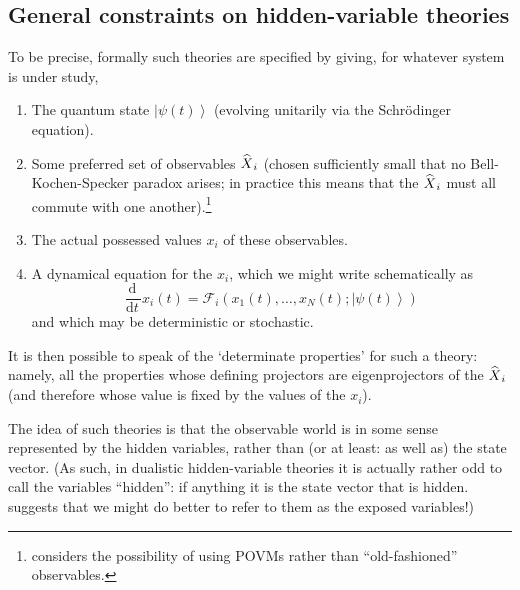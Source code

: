 \documentclass[12pt]{article}
\newcommand{\be}{\begin{equation}}
\newcommand{\ee}{\end{equation}}
\newcommand{\dr}[1]{\ensuremath{\mathrm{d} #1\,}}
\newcommand{\mc}[1]{\ensuremath{\mathcal{#1}}}
\newcommand{\ddt}{\ensuremath{\frac{\dr{}}{\dr{t}}}}
\newcommand{\ket}[1]{\ensuremath{\left|  #1 \right\rangle}}
\newcommand{\op}[1]{\ensuremath{\widehat{\textsf{\ensuremath{#1}}}}}
\begin{document}
\subsection{General constraints on hidden-variable theories}\label{DMWWhvconstraints}

To be precise, formally such theories are specified by giving, for whatever system is under study,
\begin{enumerate}
\item The quantum state \ket{\psi(t)} (evolving unitarily via the Schr\"{o}dinger equation).
\item Some preferred set of observables $\op{X}_i$ (chosen sufficiently small that no Bell-Kochen-Specker paradox arises; in practice this means that the $\op{X}_i$ must all commute with one another).\footnote{ considers the possibility of using POVMs rather than ``old-fashioned'' observables.}
\item The actual possessed values $x_i$ of these observables. 
\item A dynamical equation for the $x_i$, which we might write schematically as
\be \label{DMWWhvdyn}\ddt x_i(t)= \mc{F}_i(x_1(t),\ldots,x_N(t);\ket{\psi(t)})
\ee
and which may be deterministic or stochastic.
\end{enumerate} 
It is then possible to speak of the `determinate properties' for such a theory: namely, all the properties whose defining projectors  are eigenprojectors of the $\op{X}_i$ (and therefore whose value is fixed by the values of the $x_i$).

The idea of such theories is that the observable world is in some sense represented by the hidden variables, rather than (or at least: as well as) the state vector.  (As such, in dualistic hidden-variable theories it is actually rather odd to call the variables ``hidden'':  if anything it is the state vector that is hidden.  suggests that we might do better to refer to them as the exposed variables!)
\end{document}
